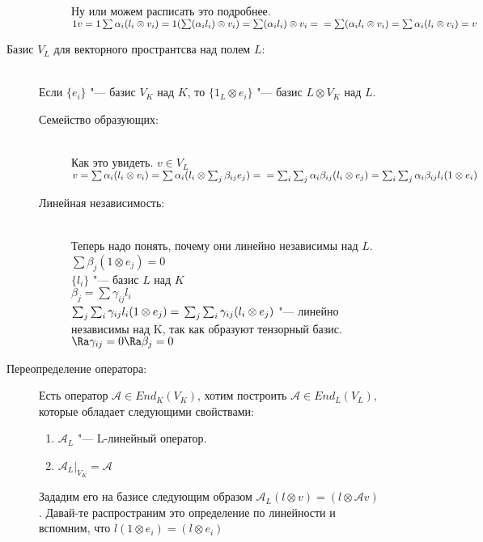 \begin{description}
\begin{description}
\begin{description}
Ну или можем расписать это подробнее.
$1v = 1\sum \alpha_i(l_i \otimes v_i) = \\
1(\sum (\alpha_i l_i) \otimes v_i) = \sum(\alpha_i l_i)\otimes v_i  =\\
= \sum(\alpha_i l_i \otimes v_i) = \sum \alpha_i(l_i \otimes v_i) = v$

    \end{description}
    \item[Базис $V_L$ для векторного пространтсва над полем $L$:] \hfill \\
Если $\{e_i\}$ "--- базис $V_K$ над $K$, то
$\{1_L \otimes e_i\}$ "--- базис $L \otimes V_K$ над $L$.
     \begin{description}
     \item[Семейство образующих:] \hfill \\
Как это увидеть. 
$v \in V_L$\\
$v = \sum \alpha_i(l_i \otimes v_i) = \sum \alpha_i(l_i \otimes \sum_{j}\beta_{ij}e_j) = \\
 = \sum_{i}\sum_{j}\alpha_i \beta_{ij} (l_i \otimes e_j) = \sum_{i}\sum_{j}\alpha_i \beta_{ij}l_i(1 \otimes e_i)$\\

     \item[Линейная независимость:] \hfill \\
Теперь надо понять, почему они линейно независимы над $L$.
$\sum \beta_{j}(1 \otimes e_j) = 0$\\
$\{l_i\}$ "--- базис $L$ над $K$\\
$\beta_j = \sum \gamma_{ij}l_i$\\
$\sum_j \sum_i \gamma_{ij}l_i(1 \otimes e_j) =\\ 
\sum_j \sum_i \gamma_{ij}(l_i \otimes e_j)$  "--- линейно независимы над K, так как образуют тензорный базис.
$\Ra \gamma_{ij} = 0 \Ra \beta_j = 0$\\
 
    \end{description}
    \item[Переопределение оператора:]
Есть оператор $\mathcal{A} \in End_K(V_K)$, хотим построить $\mathcal{A} \in End_L(V_L)$, 
которые обладает следующими свойствами:
\begin{enumerate}
\item
$\mathcal{A}_L$ "--- L-линейный оператор.
\item 
$\mathcal{A}_L|_{V_K} = \mathcal{A}$
\end{enumerate}

Зададим его на базисе следующим образом $\mathcal{A}_L(l \otimes v) = (l \otimes \mathcal{A}v)$.
Давай-те распространим это определение по линейности и вспомним, что $l(1 \otimes e_i) = (l \otimes e_i)$\\ 


\end{description}
\end{description}

